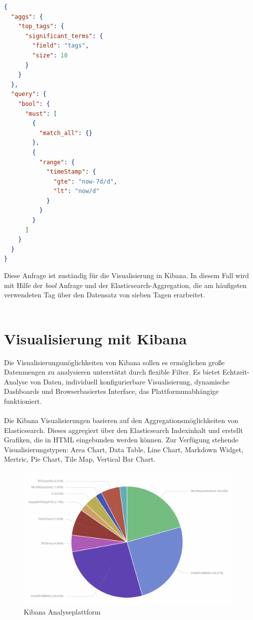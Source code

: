  \begin{lstlisting}[language=json,firstnumber=1]
{
  "aggs": {
    "top_tags": {
      "significant_terms": {
        "field": "tags",
        "size": 10
      }
    }
  },
  "query": {
    "bool": {
      "must": [
        {
          "match_all": {}
        },
        {
          "range": {
            "timeStamp": {
              "gte": "now-7d/d",
              "lt": "now/d"
            }
          }
        }
      ]
    }
  }
}
\end{lstlisting}
Diese Anfrage ist zuständig für die Visualisierung in Kibana. In diesem Fall wird mit Hilfe der \textit{bool} Anfrage und der Elasticsearch-Aggregation, die am häufigsten verwendeten Tag über den Datensatz von sieben Tagen erarbeitet.  
\\\\
\section{Visualisierung mit Kibana}
Die Visualisierungsmöglichkeiten von Kibana sollen es ermöglichen große Datenmengen zu analysieren unterstützt durch flexible Filter. Es bietet Echtzeit-Analyse von Daten, individuell konfigurierbare Visualisierung, dynamische Dashboards und Browserbasiertes Interface, das Plattformunabhängige funktioniert.\\\\
Die Kibana Visualisierungen basieren auf den Aggregationsmöglichkeiten von Elasticsearch. Dieses aggregiert über den Elasticsearch Indexinhalt und erstellt Grafiken, die in HTML eingebunden werden können. Zur Verfügung stehende Visualisierungstypen: Area Chart, Data Table, Line Chart, Markdown Widget, Mertric, Pie Chart, Tile Map, Vertical Bar Chart.
\begin{figure}[htbp!]
  \includegraphics[scale=0.4]{material/architecture/kibana.png}
  \caption{Kibana Analyseplattform} 
  \label{fig:Kibana}
\end{figure}

